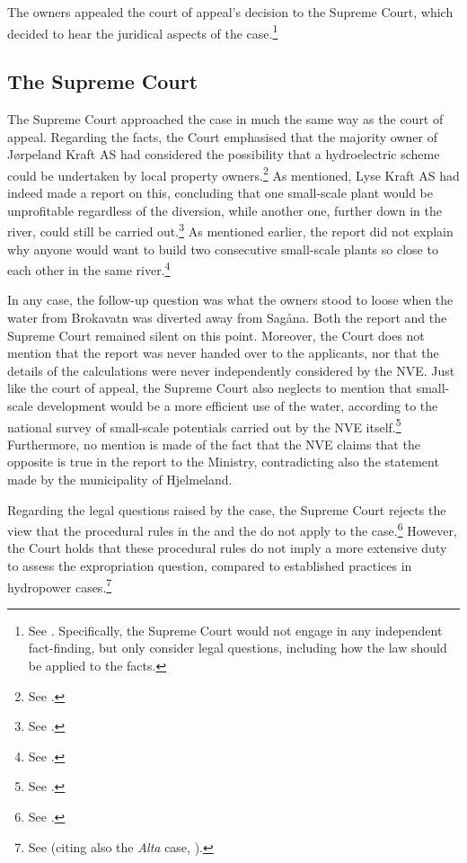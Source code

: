 The owners appealed the court of appeal's decision to the Supreme Court, which decided to hear the  juridical aspects of the case.\footnote{See \cite[8]{jorpeland11}. Specifically, the Supreme Court would not engage in any independent fact-finding, but only consider legal questions, including how the law should be applied to the facts.}

\subsection{The Supreme Court}\label{sec:5:6:4}

The Supreme Court approached the case in much the same way as the court of appeal. Regarding the facts, the Court emphasised that the majority owner of Jørpeland Kraft AS had considered the possibility that a hydroelectric scheme could be undertaken by local property owners.\footnote{See \cite[53]{jorpeland11}.} As mentioned, Lyse Kraft AS had indeed made a report on this, concluding that one small-scale plant would be unprofitable regardless of the diversion, while another one, further down in the river, could still be carried out.\footnote{See \cite[23]{jorpeland09}.} As mentioned earlier, the report did not explain why anyone would want to build two consecutive small-scale plants so close to each other in the same river.\footnote{See \cite[16|23]{jorpeland09}.}

In any case, the follow-up question was what the owners stood to loose when the water from Brokavatn was diverted away from Sagåna. Both the report and the Supreme Court remained silent on this point. Moreover, the Court does not mention that the report was never handed over to the applicants, nor that the details of the calculations were never independently considered by the NVE. Just like the court of appeal, the Supreme Court also neglects to mention that small-scale development would be a more efficient use of the water, according to the national survey of small-scale potentials carried out by the NVE itself.\footnote{See \cite[16]{jorpeland09}.} Furthermore, no mention is made of the fact that the NVE claims that the opposite is true in the report to the Ministry, contradicting also the statement made by the municipality of Hjelmeland.

Regarding the legal questions raised by the case, the Supreme Court rejects the view that the procedural rules in the \cite{ea59} and the \cite{paa67} do not apply to the case.\footnote{See \cite[32-34]{jorpeland11}.} However, the Court holds that these procedural rules do not imply a more extensive duty to assess the expropriation question, compared to established practices in hydropower cases.\footnote{See \cite[51-52]{jorpeland11} (citing also the {\it Alta} case, \cite{alta82}).}

